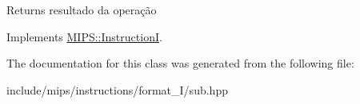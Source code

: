 \begin{DoxyReturn}{Returns}
resultado da operação 
\end{DoxyReturn}


Implements \hyperlink{classMIPS_1_1InstructionI_ae60fca5801bf5415cdff06d2aa11764f}{M\+I\+P\+S\+::\+InstructionI}.



The documentation for this class was generated from the following file\+:\begin{DoxyCompactItemize}
\item 
include/mips/instructions/format\+\_\+\+I/sub.\+hpp\end{DoxyCompactItemize}
